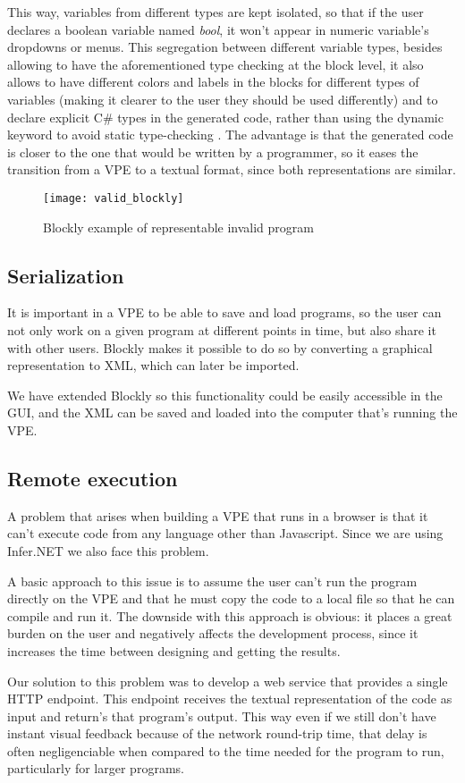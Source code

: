 This way, variables from different types are kept isolated, so that if the user
declares a boolean variable named \textit{bool}, it won't appear in numeric
variable's dropdowns or menus. This segregation between different variable types,
besides allowing to have the aforementioned type checking at the block level, it
also allows to have different colors and labels in the blocks for different types of variables
(making it clearer to the user they should be used differently) and to declare
explicit C# types in the generated code, rather than using
the dynamic keyword to avoid static type-checking \cite{cdyn}. The advantage is that
the generated code is closer to the one that would be written by a programmer,
so it eases the transition from a VPE to a textual format, since both representations
are similar.

\begin{figure}[!htpb]
  \begin{center}
    \leavevmode
    \texttt{[image: valid\_blockly]}
    \caption{Blockly example of representable invalid program}
    \label{fig:valid_blockly}
  \end{center}
\end{figure}

\subsection{Serialization}

It is important in a VPE to be able to save and load programs, so the user can
not only work on a given program at different points in time, but also share it
with other users. Blockly makes it possible to do so by converting a graphical
representation to XML, which can later be imported.

We have extended Blockly so this functionality could be easily accessible in the
GUI, and the XML can be saved and loaded into the computer that's running the VPE.

\subsection{Remote execution}

A problem that arises when building a VPE that runs in a browser is that it can't
execute code from any language other than Javascript. Since we are using Infer.NET
we also face this problem.

A basic approach to this issue is to assume the user can't run the program directly
on the VPE and that he must copy the code to a local file so that he can compile
and run it. The downside with this approach is obvious: it places a great burden
on the user and negatively affects the development process, since it increases
the time between designing and getting the results.

Our solution to this problem was to develop a web service that provides a single
HTTP endpoint. This endpoint receives the textual representation of the code as
input and return's that program's output. This way even if we still don't have
instant visual feedback because of the network round-trip time, that delay is
often negligenciable when compared to the time needed for the program to run,
particularly for larger programs.

